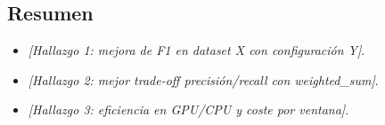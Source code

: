 \subsection{Resumen}
\begin{itemize}
    \item \textit{[Hallazgo 1: mejora de F1 en dataset X con configuración Y]}.
    \item \textit{[Hallazgo 2: mejor trade-off precisión/recall con weighted\_sum]}.
    \item \textit{[Hallazgo 3: eficiencia en GPU/CPU y coste por ventana]}.
\end{itemize}